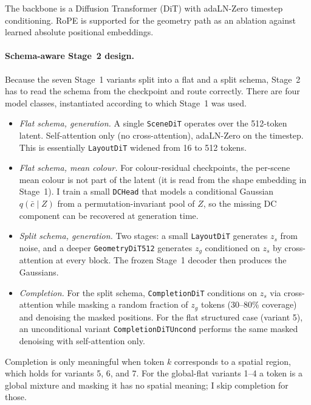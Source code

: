 The backbone is a Diffusion Transformer (DiT) \citep{peebles2023dit, ma2024sit} with adaLN-Zero timestep conditioning. RoPE \citep{su2021roformer} is supported for the geometry path as an ablation against learned absolute positional embeddings.

\paragraph{Schema-aware Stage~2 design.} Because the seven Stage~1 variants split into a flat and a split schema, Stage~2 has to read the schema from the checkpoint and route correctly. There are four model classes, instantiated according to which Stage~1 was used.

\begin{itemize}
\item \emph{Flat schema, generation.} A single \texttt{SceneDiT} operates over the 512-token latent. Self-attention only (no cross-attention), adaLN-Zero on the timestep. This is essentially \texttt{LayoutDiT} widened from 16 to 512 tokens.
\item \emph{Flat schema, mean colour.} For colour-residual checkpoints, the per-scene mean colour is not part of the latent (it is read from the shape embedding in Stage~1). I train a small \texttt{DCHead} that models a conditional Gaussian $q(\bar{c} \mid Z)$ from a permutation-invariant pool of $Z$, so the missing DC component can be recovered at generation time.
\item \emph{Split schema, generation.} Two stages: a small \texttt{LayoutDiT} generates $z_s$ from noise, and a deeper \texttt{GeometryDiT512} generates $z_g$ conditioned on $z_s$ by cross-attention at every block. The frozen Stage~1 decoder then produces the Gaussians.
\item \emph{Completion.} For the split schema, \texttt{CompletionDiT} conditions on $z_s$ via cross-attention while masking a random fraction of $z_g$ tokens (30--80\% coverage) and denoising the masked positions. For the flat structured case (variant 5), an unconditional variant \texttt{CompletionDiTUncond} performs the same masked denoising with self-attention only.
\end{itemize}
Completion is only meaningful when token $k$ corresponds to a spatial region, which holds for variants 5, 6, and 7. For the global-flat variants 1--4 a token is a global mixture and masking it has no spatial meaning; I skip completion for those.

